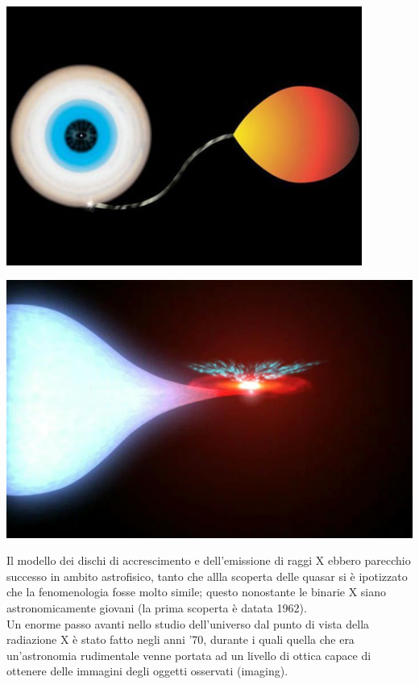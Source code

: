 \vspace{0,15cm}
\begin{minipage}{.45\textwidth}
	\centering
	\includegraphics[width=0.875\textwidth]{Img/lobo_roche.jpg}
\end{minipage}
\begin{minipage}{.45\textwidth}
	\centering
	\includegraphics[width=1\textwidth]{Img/binaria_x.png}
\end{minipage}

\vspace{0,15cm}

Il modello dei dischi di accrescimento e dell'emissione di raggi X ebbero parecchio successo in ambito astrofisico, tanto che allla scoperta delle quasar si è ipotizzato che la fenomenologia fosse molto simile; questo nonostante le binarie X siano astronomicamente giovani (la prima scoperta è datata 1962).
\\
Un enorme passo avanti nello studio dell'universo dal punto di vista della radiazione X è stato fatto negli anni '70, durante i quali quella che era un'astronomia rudimentale venne portata ad un livello di ottica capace di ottenere delle immagini degli oggetti osservati (imaging).
\\

